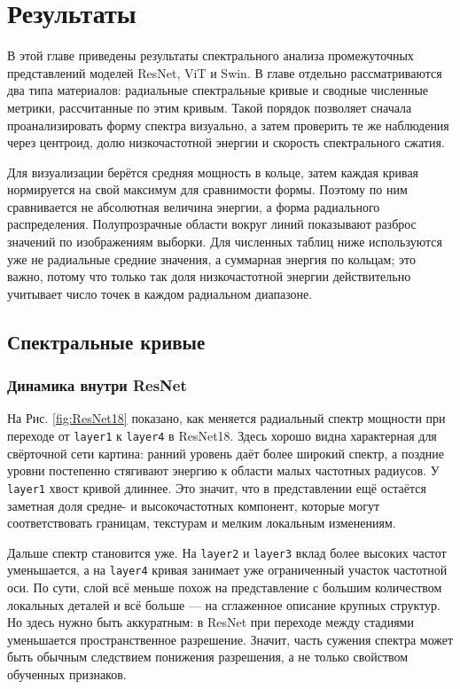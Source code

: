\chapter{Результаты}

В этой главе приведены результаты спектрального анализа промежуточных представлений моделей ResNet, ViT и Swin. В главе отдельно рассматриваются два типа материалов: радиальные спектральные кривые и сводные численные метрики, рассчитанные по этим кривым. Такой порядок позволяет сначала проанализировать форму спектра визуально, а затем проверить те же наблюдения через центроид, долю низкочастотной энергии и скорость спектрального сжатия.

Для визуализации берётся средняя мощность в кольце, затем каждая кривая нормируется на свой максимум для сравнимости формы. Поэтому по ним сравнивается не абсолютная величина энергии, а форма радиального распределения. Полупрозрачные области вокруг линий показывают разброс значений по изображениям выборки. Для численных таблиц ниже используются уже не радиальные средние значения, а суммарная энергия по кольцам; это важно, потому что только так доля низкочастотной энергии действительно учитывает число точек в каждом радиальном диапазоне.

\section{Спектральные кривые}

\subsection{Динамика внутри ResNet}

На Рис. \ref{fig:ResNet18} показано, как меняется радиальный спектр мощности при переходе от \texttt{layer1} к \texttt{layer4} в ResNet18. Здесь хорошо видна характерная для свёрточной сети картина: ранний уровень даёт более широкий спектр, а поздние уровни постепенно стягивают энергию к области малых частотных радиусов. У \texttt{layer1} хвост кривой длиннее. Это значит, что в представлении ещё остаётся заметная доля средне- и высокочастотных компонент, которые могут соответствовать границам, текстурам и мелким локальным изменениям.

Дальше спектр становится уже. На \texttt{layer2} и \texttt{layer3} вклад более высоких частот уменьшается, а на \texttt{layer4} кривая занимает уже ограниченный участок частотной оси. По сути, слой всё меньше похож на представление с большим количеством локальных деталей и всё больше — на сглаженное описание крупных структур. Но здесь нужно быть аккуратным: в ResNet при переходе между стадиями уменьшается пространственное разрешение. Значит, часть сужения спектра может быть обычным следствием понижения разрешения, а не только свойством обученных признаков.

